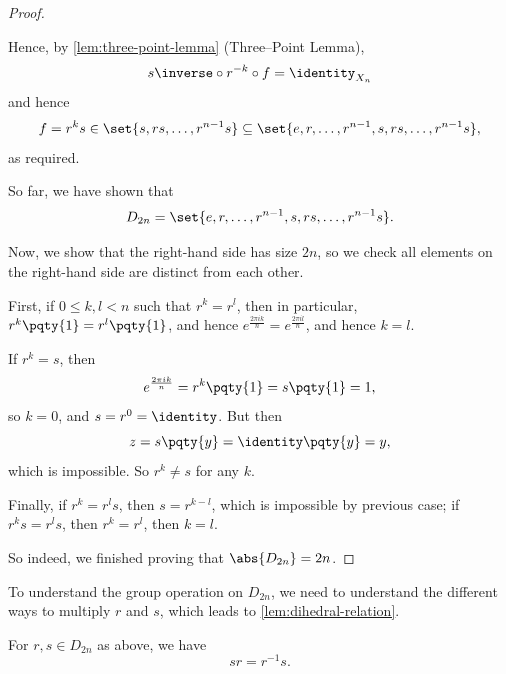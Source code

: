 \begin{proof}
\begin{enumerate}
        Hence, by \autoref{lem:three-point-lemma} (Three--Point Lemma),
        \[
            s\inverse \circ r^{-k} \circ f = \identity_{X_n}
        \]
        and hence
        \[
            f = r^k s \in \set{s, rs, \ldots, r^{n - 1}s} \subseteq \set{e, r, \ldots, r^{n - 1}, s, rs, \ldots, r^{n - 1}s},
        \]
        as required.
    \end{enumerate}

    So far, we have shown that
    \[
        D_{2n} = \set{e, r, \ldots, r^{n - 1}, s, rs, \ldots, r^{n - 1}s}.
    \]

    Now, we show that the right-hand side has size \(2n\), so we check all elements on the right-hand side are distinct from each other.

    First, if \(0 \leq k, l < n\) such that \(r^k = r^l\), then in particular, \(r^k \pqty{1} = r^l \pqty{1}\), and hence \(e^{\frac{2 \pi i k}{n}} = e^{\frac{2 \pi i l}{n}}\), and hence \(k = l\).

    If \(r^{k} = s\), then
    \[
        e^{\frac{2 \pi i k}{n}} = r^{k} \pqty{1} = s \pqty{1} = 1,
    \]
    so \(k = 0\), and \(s = r^{0} = \identity\). But then
    \[
        z = s\pqty{y} = \identity\pqty{y} = y,
    \]
    which is impossible. So \(r^{k} \neq s\) for any \(k\).

    Finally, if \(r^{k} = r^{l} s\), then \(s = r^{k - l}\), which is impossible by previous case; if \(r^{k} s = r^{l} s\), then \(r^{k} = r^{l}\), then \(k = l\).

    So indeed, we finished proving that \(\abs{D_{2n}} = 2n\).
\end{proof}

To understand the group operation on \(D_{2n}\), we need to understand the different ways to multiply \(r\) and \(s\), which leads to \autoref{lem:dihedral-relation}.

\begin{lemma}
    \label{lem:dihedral-relation}%
    For \(r, s \in D_{2n}\) as above, we have
    \[
        s r = r^{-1} s.
    \]
\end{lemma}


